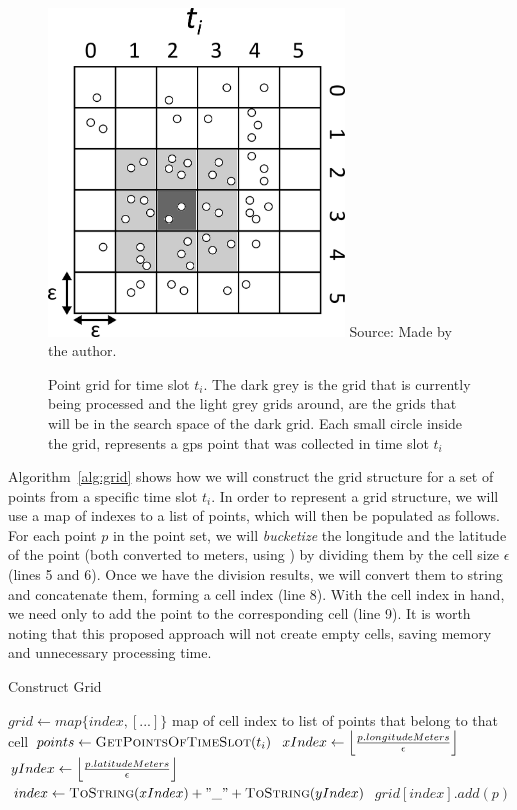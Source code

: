 \begin{figure}[h!]
    \centering
    \caption{Point grid for time slot $t_i$. The dark grey is the grid that is currently being processed and the light
        grey grids around, are the grids that will be in the search space of the dark grid. Each small circle inside the
        grid, represents a \ac{gps} point that was collected in time slot $t_i$}
    \includegraphics[width=0.7\textwidth]{images/grid.png}
    \footnotesize{Source: Made by the author.}
    \label{fig:grid}
\end{figure}

Algorithm~\ref{alg:grid} shows how we will construct the grid structure for a set of points from a specific time slot
$t_i$. In order to represent a grid structure, we will use a map of indexes to a list of points, which will then be
populated as follows. For each point $p$ in the point set, we will \textit{bucketize} the longitude and the latitude of
the point (both converted to meters, using ) by dividing them by the cell size $\epsilon$ (lines 5
and 6).  Once we have the division results, we will convert them to string and concatenate them, forming a cell index
(line 8).  With the cell index in hand, we need only to add the point to the corresponding cell (line 9). It is worth
noting that this proposed approach will not create empty cells, saving memory and unnecessary processing time.

\begin{algorithm}
\caption{Construct Grid}
\label{alg:grid}
\begin{algorithmic}[1]
    \State $grid \gets map\{index, [...]\}$ \Comment map of cell index to list of points that belong to that cell
    \State $points \gets \Call{GetPointsOfTimeSlot}{t_i}$
    \State
        \State $xIndex \gets \floor*{\frac{p.longitudeMeters}{\epsilon}}$
        \State $yIndex \gets \floor*{\frac{p.latitudeMeters}{\epsilon}}$
        \State
        \State $index \gets \Call{ToString}{xIndex} + "\_" + \Call{ToString}{yIndex}$
        \State $grid[index].add(p)$
    \EndFor
\end{algorithmic}
\end{algorithm}


